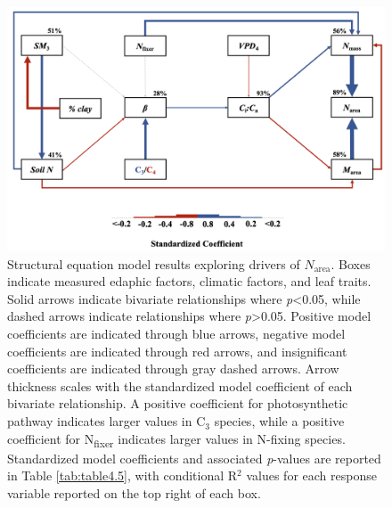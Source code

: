 \newpage
    \begin{figure}
        \centering
        \includegraphics[width=\textwidth]{ch4_TXeco/figs/TXeco_fig5_SEM.jpg}
        \caption[Structural equation model results exploring drivers of $N_\mathrm{area}$]{Structural equation model results exploring drivers of $N_\mathrm{area}$. Boxes indicate measured edaphic factors, climatic factors, and leaf traits. Solid arrows indicate bivariate relationships where \textit{p}<0.05, while dashed arrows indicate relationships where \textit{p}>0.05. Positive model coefficients are indicated through blue arrows, negative model coefficients are indicated through red arrows, and insignificant coefficients are indicated through gray dashed arrows. Arrow thickness scales with the standardized model coefficient of each bivariate relationship. A positive coefficient for photosynthetic pathway indicates larger values in C$_3$ species, while a positive coefficient for N\textsubscript{fixer} indicates larger values in N-fixing species. Standardized model coefficients and associated \textit{p}-values are reported in Table \ref{tab:table4.5}, with conditional R$^2$ values for each response variable reported on the top right of each box.}
        \label{fig:figure4.5}
    \end{figure}
\clearpage


